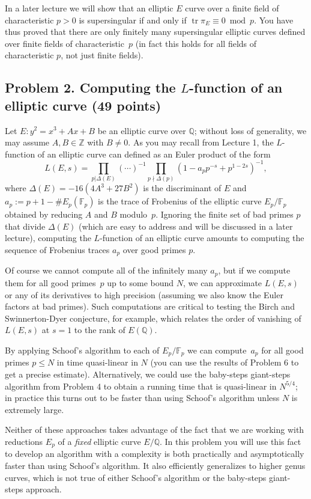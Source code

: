 \documentclass[11pt]{article}
\newcommand{\Fp}{\mathbb{F}_p}
\newcommand{\Q}{\mathbb{Q}}
\newcommand{\Z}{\mathbb{Z}}
\newcommand{\tr}{\operatorname{tr}}
\begin{document}
In a later lecture we will show that an elliptic $E$ curve over a finite field of characteristic $p>0$ is supersingular if and only if $\tr \pi_E\equiv 0\bmod p$.
You have thus proved that there are only finitely many supersingular elliptic curves defined over finite fields of characteristic~$p$ (in fact this holds for all fields of characteristic $p$, not just finite fields).

\subsection*{Problem 2. Computing the $L$-function of an elliptic curve (49 points)}

Let $E\colon y^2=x^3+Ax+B$ be an elliptic curve over $\Q$; without loss of generality, we may assume $A,B\in\Z$ with $B\ne 0$.
As you may recall from Lecture 1, the $L$-function of an elliptic curve can defined as an Euler product of the form
\[
L(E,s) = \prod_{p|\Delta(E)} (\cdots)^{-1}\prod_{p\nmid \Delta(p)} (1-a_pp^{-s}+p^{1-2s})^{-1},
\]
where $\Delta(E)=-16(4A^3+27B^2)$ is the discriminant of $E$ and $a_p:=p+1-\#E_p(\Fp)$ is the trace of Frobenius of the elliptic curve $E_p/\Fp$ obtained by reducing $A$ and $B$ modulo~$p$.  Ignoring the finite set of bad primes $p$ that divide $\Delta(E)$ (which are easy to address and will be discussed in a later lecture), computing the $L$-function of an elliptic curve amounts to computing the sequence of Frobenius traces $a_p$ over good primes $p$.

Of course we cannot compute all of the infinitely many $a_p$, but if we compute them for all good primes~$p$ up to some bound $N$, we can approximate $L(E,s)$ or any of its derivatives to high precision (assuming we also know the Euler factors at bad primes). Such computations are critical to testing the Birch and Swinnerton-Dyer conjecture, for example, which relates the order of vanishing of $L(E,s)$ at $s=1$ to the rank of $E(\Q)$.

By applying Schoof's algorithm to each of $E_p/\Fp$ we can compute~$a_p$ for all good primes $p\le N$ in time quasi-linear in $N$ (you can use the results of Problem 6 to get a precise estimate).  Alternatively, we could use the baby-steps giant-steps algorithm from Problem 4 to obtain a running time that is quasi-linear in $N^{5/4}$; in practice this turns out to be faster than using Schoof's algorithm unless $N$ is extremely large.

Neither of these approaches takes advantage of the fact that we are working with reductions $E_p$ of a \emph{fixed} elliptic curve $E/\Q$.
In this problem you will use this fact to develop an algorithm with a complexity is both practically and asymptotically faster than using Schoof's algorithm.
It also efficiently generalizes to higher genus curves, which is not true of either Schoof's algorithm or the baby-steps giant-steps approach.
\end{document}
